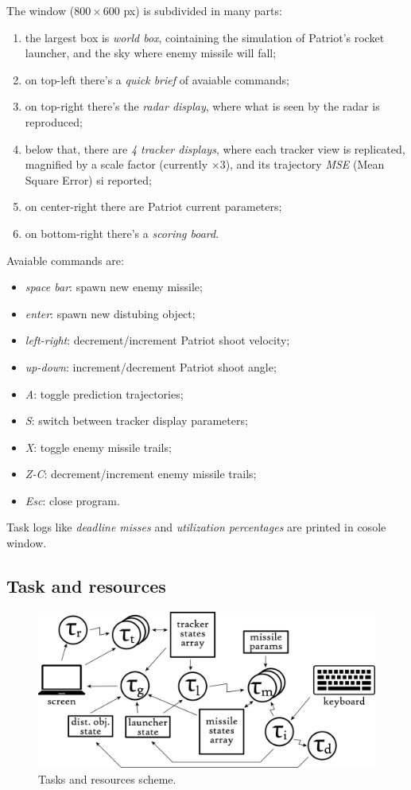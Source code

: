 \documentclass[notitlepage,a4paper,11pt]{article} %
\begin{document}
		The window ($800\times600$ px) is subdivided in many parts:
		\begin{enumerate}
			\item the largest box is \emph{world box}, cointaining the simulation of Patriot's rocket launcher, and the sky where enemy missile will fall;
			\item on top-left there's a \emph{quick brief} of avaiable commands;
			\item on top-right there's the \emph{radar display}, where what is seen by the radar is reproduced;
			\item below that, there are \emph{4 tracker displays}, where each tracker view is replicated, magnified by a scale factor (currently $\times3$), and its trajectory \emph{MSE} (Mean Square Error) si reported;
			\item on center-right there are Patriot current parameters;
			\item on bottom-right there's a \emph{scoring board}.
		\end{enumerate}
		Avaiable commands are:
		\begin{itemize}
			\item \emph{space bar}: spawn new enemy missile;
			\item \emph{enter}: spawn new distubing object;
			\item \emph{left-right}: decrement/increment Patriot shoot velocity;
			\item \emph{up-down}: increment/decrement Patriot shoot angle;
			\item \emph{A}: toggle prediction trajectories;
			\item \emph{S}: switch between tracker display parameters;
			\item \emph{X}: toggle enemy missile trails;
			\item \emph{Z-C}: decrement/increment enemy missile trails;
			\item \emph{Esc}: close program.
		\end{itemize}
		Task logs like \emph{deadline misses} and \emph{utilization percentages} are printed in cosole window.

	\subsection{Task and resources}

		\begin{figure}[hb]
			\includegraphics[width=\textwidth]{task_scheme}
			\caption{Tasks and resources scheme.}
			\label{fig:task_scheme}
		\end{figure}
\end{document}
